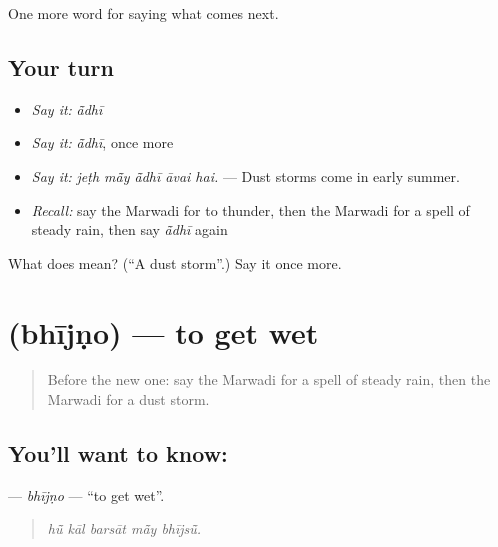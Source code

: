\begin{grammarlens}[title={What you've built}]
One more word for saying what comes next.
\end{grammarlens}

\subsection*{Your turn}
\begin{itemize}
\raggedright
  \item \emph{Say it:} \emph{ā̃dhī}
  \item \emph{Say it:} \emph{ā̃dhī}, once more
  \item \emph{Say it:} \emph{jeṭh mā̃y ā̃dhī āvai hai.} — Dust storms come in early summer.
  \item \emph{Recall:} say the Marwadi for to thunder, then the Marwadi for a spell of steady rain, then say \emph{ā̃dhī} again
\end{itemize}

\begin{tcolorbox}[breakable,colback=teal!4,colframe=teal!35!black,title={Before you move on}]
What does  mean? (\textquotedblleft{}A dust storm\textquotedblright{}.) Say it once more.
\end{tcolorbox}
\section[\texorpdfstring{\mw{भीजणो} (bhījṇo)}{भीजणो (bhījṇo)}]{ (bhījṇo) — to get wet}

\label{lesson:MW-C222-bhijno}



\begin{quote}
Before the new one: say the Marwadi for a spell of steady rain, then the Marwadi for a dust storm.
\end{quote}

\subsection*{You'll want to know: }
\textbf{} — \emph{bhījṇo} — \textquotedblleft{}to get wet\textquotedblright{}.

\begin{quote}
    
\end{quote}

\begin{quote}
\emph{hū̃ kāl barsāt mā̃y bhījsū̃.}
\end{quote}

